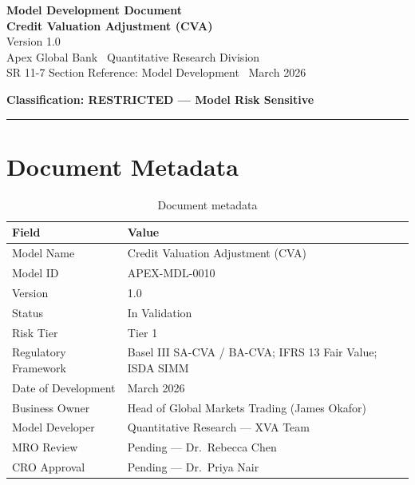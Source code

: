 \documentclass[11pt,a4paper]{article}
\begin{document}
\begin{center}
  {\LARGE\bfseries\color{apexblue} Model Development Document}\\[0.4em]
  {\Large\bfseries Credit Valuation Adjustment (CVA)}\\[0.3em]
  {\large Version 1.0}\\[0.6em]
  {\normalsize Apex Global Bank \textbar\ Quantitative Research Division}\\[0.2em]
  {\small\color{apexgray} SR 11-7 Section Reference: Model Development \textbar\ March 2026}
\end{center}

\vspace{1em}
\textcolor{apexred}{\textbf{Classification: RESTRICTED --- Model Risk Sensitive}}
\vspace{1em}
\hrule
\vspace{1em}

\section{Document Metadata}

\begin{table}[h!]
\centering
\begin{tabular}{@{}ll@{}}
\toprule
\textbf{Field} & \textbf{Value} \\
\midrule
Model Name           & Credit Valuation Adjustment (CVA) \\
Model ID             & APEX-MDL-0010 \\
Version              & 1.0 \\
Status               & In Validation \\
Risk Tier            & Tier 1 \\
Regulatory Framework & Basel III SA-CVA / BA-CVA; IFRS 13 Fair Value; ISDA SIMM \\
Date of Development  & March 2026 \\
Business Owner       & Head of Global Markets Trading (James Okafor) \\
Model Developer      & Quantitative Research --- XVA Team \\
MRO Review           & Pending --- Dr.\ Rebecca Chen \\
CRO Approval         & Pending --- Dr.\ Priya Nair \\
\bottomrule
\end{tabular}
\caption{Document metadata}
\end{table}
\end{document}
